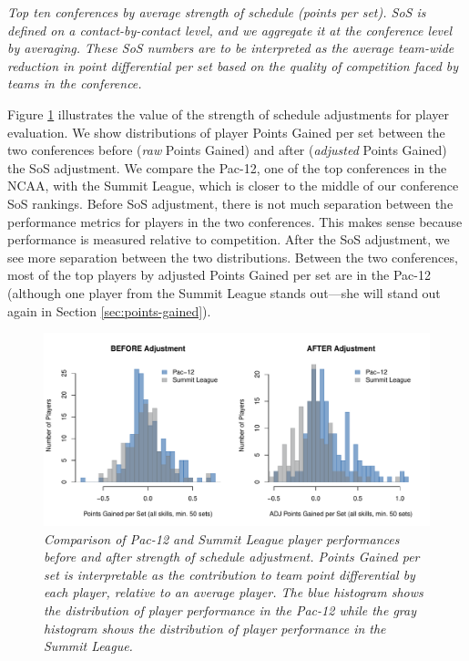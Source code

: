 \documentclass{article}
\begin{document}
\begin{table}
    \centering
    
    \caption{\it Top ten conferences by average strength of schedule (points per set). SoS is defined on a contact-by-contact level, and we aggregate it at the conference level by averaging. These SoS numbers are to be interpreted as the average team-wide reduction in point differential per set based on the quality of competition faced by teams in the conference.}
    \label{tab:top-ten-conferences}
\end{table}

Figure \ref{fig:conference-comparison} illustrates the value of the strength of schedule adjustments for player evaluation. We show distributions of player Points Gained per set between the two conferences before ({\it raw} Points Gained) and after ({\it adjusted} Points Gained) the SoS adjustment. We compare the Pac-12, one of the top conferences in the NCAA, with the Summit League, which is closer to the middle of our conference SoS rankings. Before SoS adjustment, there is not much separation between the performance metrics for players in the two conferences. This makes sense because performance is measured relative to competition. After the SoS adjustment, we see more separation between the two distributions. Between the two conferences, most of the top players by adjusted Points Gained per set are in the Pac-12 (although one player from the Summit League stands out---she will stand out again in Section \ref{sec:points-gained}).

\begin{figure}
    \centering
    \includegraphics[width=\textwidth]{figures/conference_comparison.pdf}
    \caption{\it Comparison of Pac-12 and Summit League player performances before and after strength of schedule adjustment. Points Gained per set is interpretable as the contribution to team point differential by each player, relative to an average player. The blue histogram shows the distribution of player performance in the Pac-12 while the gray histogram shows the distribution of player performance in the Summit League.}
    \label{fig:conference-comparison}
\end{figure}
\end{document}

